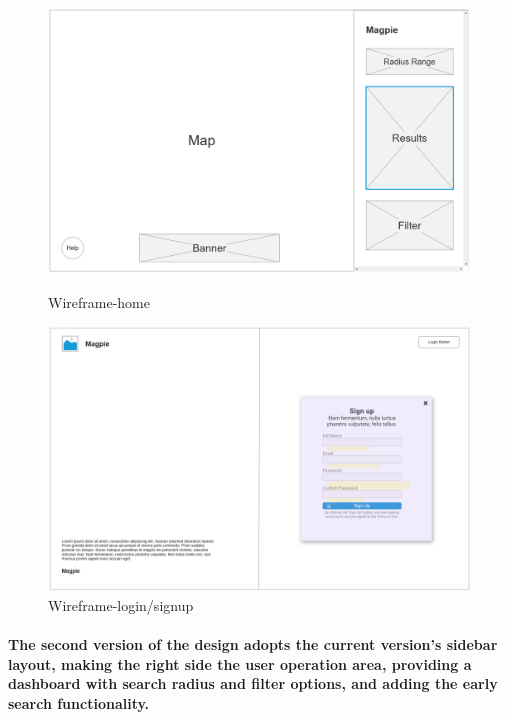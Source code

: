 \begin{figure}[h]
    \centering
    \begin{minipage}{0.48\textwidth}
        \centering
        \includegraphics[width=\textwidth]{images/wireframe-home.jpg}
        \caption{Wireframe-home}
        \label{fig:wireframe-home}
    \end{minipage}
    \hfill
    \begin{minipage}{0.48\textwidth}
        \centering
        \includegraphics[width=\textwidth]{images/wireframe-signup.jpg}
        \caption{Wireframe-login/signup}
        \label{fig:wireframe-signup}
    \end{minipage}
\end{figure}

\paragraph{The second version of the design adopts the current version's sidebar layout, making the right side the user operation area, providing a dashboard with search radius and filter options, and adding the early search functionality.}

